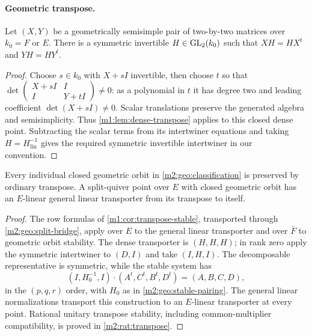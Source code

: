 \paragraph{Geometric transpose.}

\begin{lemma}\label{m2:geo:pair-transpose}
Let $(X,Y)$ be a geometrically semisimple pair of two-by-two
matrices over $k_0=F$ or $E$. There is a symmetric invertible
$H\in\operatorname{GL}_2(k_0)$ such that $XH=HX^t$ and $YH=HY^t$.
\end{lemma}

\begin{proof}
Choose $s\in k_0$ with $X+sI$ invertible, then choose $t$ so that
$\det\left(\begin{smallmatrix}X+sI&I\\I&Y+tI\end{smallmatrix}\right)\ne0$:
as a polynomial in $t$ it has degree two and leading coefficient
$\det(X+sI)\ne0$. Scalar translations preserve the generated algebra
and semisimplicity. Thus \cref{m1:lem:dense-transpose} applies to this
closed dense point. Subtracting the scalar terms from its intertwiner
equations and taking $H=H_{\mathrm{lin}}^{-1}$ gives the required
symmetric invertible intertwiner in our convention.
\end{proof}

\begin{proposition}
\label{m2:geo:transpose}
Every individual closed geometric orbit in
\cref{m2:geo:classification} is preserved by ordinary transpose.
A split-quiver point over $E$ with closed geometric orbit has
an $E$-linear general linear transporter from its transpose to itself.
\end{proposition}

\begin{proof}
The row formulas of \cref{m1:cor:transpose-stable}, transported
through \cref{m2:geo:split-bridge}, apply over $E$ to the general
linear transporter and over $\bar F$ to geometric orbit stability. The dense
transporter is $(H,H,H)$; in rank zero apply the symmetric
intertwiner to $(D,I)$ and take $(I,H,I)$. The decomposable
representative is symmetric, while the stable system has
\begin{equation}\label{m2:geo:stable-transporter}
 (I,H_0^{-1},I)\cdot(A^t,C^t,B^t,D^t)=(A,B,C,D),
\end{equation}
in the $(p,q,r)$ order, with $H_0$ as in
\eqref{m2:geo:stable-pairing}.
The general linear normalizations transport this construction to
an $E$-linear transporter at every point. Rational unitary transpose
stability, including common-multiplier compatibility, is proved in
\cref{m2:rat:transpose}.
\end{proof}

